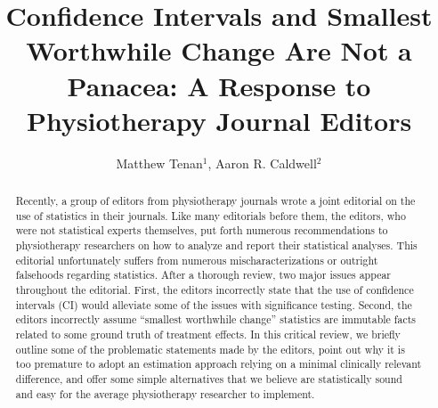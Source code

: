 \documentclass[]{cik}%
\begin{document}
\captionsetup[table]{labelformat=empty}
\captionsetup[figure]{labelformat=empty}
\raggedbottom

\title{Confidence Intervals and Smallest Worthwhile Change Are Not a
Panacea: A Response to Physiotherapy Journal Editors}

\author{
Matthew Tenan$^{1}$,
Aaron R. Caldwell$^{2}$}

\address{
  $^{1}$Rockefeller Neuroscience Institute, West Virginia University,
Morgantown, West Virginia, USA\\
  $^{2}$Natick, MA}
\subject{
}


\inserttype{
{\Large }
}




\begin{abstract}
Recently, a group of editors from physiotherapy journals wrote a joint
editorial on the use of statistics in their journals. Like many
editorials before them, the editors, who were not statistical experts
themselves, put forth numerous recommendations to physiotherapy
researchers on how to analyze and report their statistical analyses.
This editorial unfortunately suffers from numerous mischaracterizations
or outright falsehoods regarding statistics. After a thorough review,
two major issues appear throughout the editorial. First, the editors
incorrectly state that the use of confidence intervals (CI) would
alleviate some of the issues with significance testing. Second, the
editors incorrectly assume ``smallest worthwhile change'' statistics are
immutable facts related to some ground truth of treatment effects. In
this critical review, we briefly outline some of the problematic
statements made by the editors, point out why it is too premature to
adopt an estimation approach relying on a minimal clinically relevant
difference, and offer some simple alternatives that we believe are
statistically sound and easy for the average physiotherapy researcher to
implement.
\end{abstract}
\end{document}
